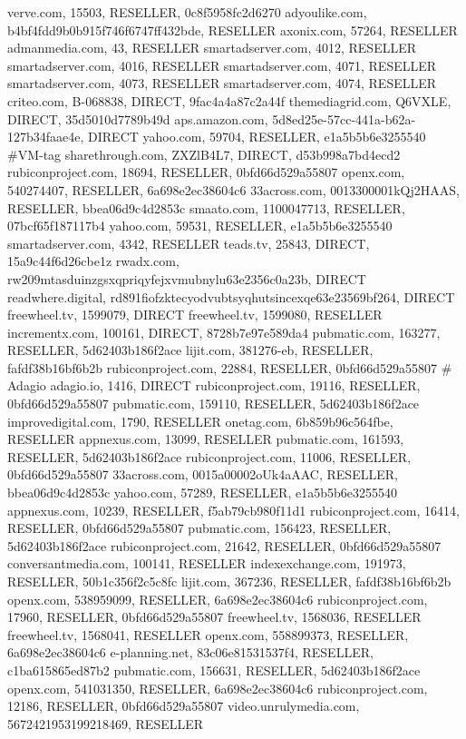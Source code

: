 verve.com, 15503, RESELLER, 0c8f5958fc2d6270
adyoulike.com, b4bf4fdd9b0b915f746f6747ff432bde, RESELLER
axonix.com, 57264, RESELLER
admanmedia.com, 43, RESELLER
smartadserver.com, 4012, RESELLER
smartadserver.com, 4016, RESELLER
smartadserver.com, 4071, RESELLER
smartadserver.com, 4073, RESELLER
smartadserver.com, 4074, RESELLER
criteo.com, B-068838, DIRECT, 9fac4a4a87c2a44f
themediagrid.com, Q6VXLE, DIRECT, 35d5010d7789b49d
aps.amazon.com, 5d8ed25e-57cc-441a-b62a-127b34faae4e, DIRECT
yahoo.com, 59704, RESELLER, e1a5b5b6e3255540 #VM-tag
sharethrough.com, ZXZlB4L7, DIRECT, d53b998a7bd4ecd2
rubiconproject.com, 18694, RESELLER, 0bfd66d529a55807
openx.com, 540274407, RESELLER, 6a698e2ec38604c6
33across.com, 0013300001kQj2HAAS, RESELLER, bbea06d9c4d2853c
smaato.com, 1100047713, RESELLER, 07bcf65f187117b4
yahoo.com, 59531, RESELLER, e1a5b5b6e3255540
smartadserver.com, 4342, RESELLER
teads.tv, 25843, DIRECT, 15a9c44f6d26cbe1z
rwadx.com, rw209mtasduinzgsxqpriqyfejxvmubnylu63e2356c0a23b, DIRECT
readwhere.digital, rd891fiofzktecyodvubtsyqhutsincexqe63e23569bf264, DIRECT
freewheel.tv, 1599079, DIRECT
freewheel.tv, 1599080, RESELLER
incrementx.com, 100161, DIRECT, 8728b7e97e589da4
pubmatic.com, 163277, RESELLER, 5d62403b186f2ace
lijit.com, 381276-eb, RESELLER, fafdf38b16bf6b2b
rubiconproject.com, 22884, RESELLER, 0bfd66d529a55807
# Adagio
adagio.io, 1416, DIRECT
rubiconproject.com, 19116, RESELLER, 0bfd66d529a55807
pubmatic.com, 159110, RESELLER, 5d62403b186f2ace
improvedigital.com, 1790, RESELLER
onetag.com, 6b859b96c564fbe, RESELLER
appnexus.com, 13099, RESELLER
pubmatic.com, 161593, RESELLER, 5d62403b186f2ace
rubiconproject.com, 11006, RESELLER, 0bfd66d529a55807
33across.com, 0015a00002oUk4aAAC, RESELLER, bbea06d9c4d2853c
yahoo.com, 57289, RESELLER, e1a5b5b6e3255540
appnexus.com, 10239, RESELLER, f5ab79cb980f11d1
rubiconproject.com, 16414, RESELLER, 0bfd66d529a55807
pubmatic.com, 156423, RESELLER, 5d62403b186f2ace
rubiconproject.com, 21642, RESELLER, 0bfd66d529a55807
conversantmedia.com, 100141, RESELLER
indexexchange.com, 191973, RESELLER, 50b1c356f2c5c8fc
lijit.com, 367236, RESELLER, fafdf38b16bf6b2b
openx.com, 538959099, RESELLER, 6a698e2ec38604c6
rubiconproject.com, 17960, RESELLER, 0bfd66d529a55807
freewheel.tv, 1568036, RESELLER
freewheel.tv, 1568041, RESELLER
openx.com, 558899373, RESELLER, 6a698e2ec38604c6
e-planning.net, 83c06e81531537f4, RESELLER, c1ba615865ed87b2
pubmatic.com, 156631, RESELLER, 5d62403b186f2ace
openx.com, 541031350, RESELLER, 6a698e2ec38604c6
rubiconproject.com, 12186, RESELLER, 0bfd66d529a55807
video.unrulymedia.com, 5672421953199218469, RESELLER
